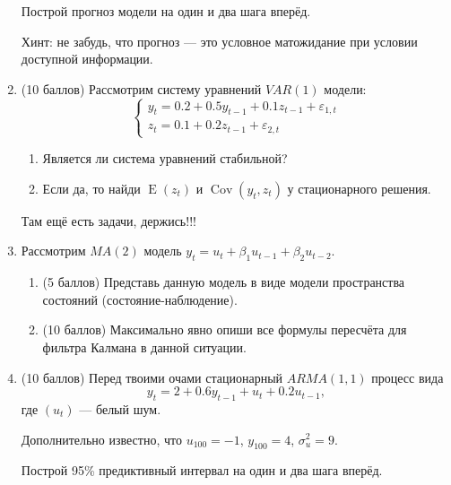 \documentclass[12pt]{article}
\DeclareMathOperator{\Cov}{Cov}
\DeclareMathOperator{\E}{E}
\begin{document}
\begin{enumerate}
    Построй прогноз модели на один и два шага вперёд.
     
    Хинт: не забудь, что прогноз — это условное матожидание при условии доступной информации.
	
	\item (10 баллов) 
	Рассмотрим систему уравнений $VAR(1)$ модели:
	\[
	\begin{cases}
		y_t = 0.2 + 0.5 y_{t-1} + 0.1 z_{t-1} + \varepsilon_{1, t}\\
		z_t = 0.1 + 0.2 z_{t-1} +  \varepsilon_{2, t} 
	\end{cases}
\]
\begin{enumerate}
    \item Является ли система уравнений стабильной?
    \item Если да, то найди $\E(z_t)$ и $\Cov(y_t, z_t)$ у стационарного решения.
\end{enumerate}

Там ещё есть задачи, держись!!!

\newpage

\item Рассмотрим $MA(2)$ модель $y_t = u_t + \beta_1 u_{t-1} + \beta_2 u_{t-2}$.
\begin{enumerate}
    \item (5 баллов) Представь данную модель в виде модели пространства состояний (состояние-наблюдение). 
    \item (10 баллов) Максимально явно опиши все формулы пересчёта для фильтра Калмана в данной ситуации.
\end{enumerate}


\item (10 баллов) Перед твоими очами стационарный $ARMA(1,1)$ процесс вида
\[
y_t = 2 + 0.6 y_{t-1} + u_t + 0.2 u_{t-1},
\]
где $(u_t)$ — белый шум. 

Дополнительно известно, что $u_{100}=-1$, $y_{100}=4$, $\sigma^2_u = 9$. 

Построй 95\% предиктивный интервал на один и два шага вперёд.


\end{enumerate}
\end{document}
